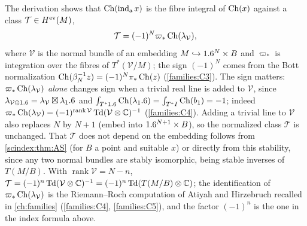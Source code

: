 \begin{remark}\label{scindex:rem:todd}
  The derivation shows that $\operatorname{Ch}(\operatorname{ind}_{\mathrm{a}} x)$ is the fibre integral of
  $\operatorname{Ch}(x)$ against a class $\mathcal T\in H^{\mathrm{ev}}(M)$,
  \begin{equation*}
    \mathcal T=(-1)^N\varpi_*\operatorname{Ch}(\lambda_{\mathcal V}),
  \end{equation*}
  where $\mathcal V$ is the normal bundle of an embedding $M\hookrightarrow
  1.6^N\times B$ and $\varpi_*$ is integration over the fibres of
  $T^*(\mathcal V/M)$; the sign $(-1)^N$ comes from the Bott normalization
  $\operatorname{Ch}(\beta_N^{-1}z)=(-1)^N\pi_*\operatorname{Ch}(z)$ (\ref{families:C3}). The sign matters:
  $\varpi_*\operatorname{Ch}(\lambda_{\mathcal V})$ \emph{alone} changes sign when a trivial
  real line is added to $\mathcal V$, since $\lambda_{\mathcal V\oplus1.6}=
  \lambda_{\mathcal V}\boxtimes\lambda_1.6$ and $\int_{T^*1.6}\operatorname{Ch}(\lambda_1.6)=
  \int_{T^*I}\operatorname{Ch}(b_1)=-1$; indeed $\varpi_*\operatorname{Ch}(\lambda_{\mathcal V})=
  (-1)^{\operatorname{rank}\mathcal V}\operatorname{Td}(\mathcal V\otimes\mathbb{C})^{-1}$
  (\ref{families:C4}). Adding a trivial line to $\mathcal V$ also replaces $N$ by
  $N+1$ (embed into $1.6^{N+1}\times B$), so the normalized class $\mathcal T$ is
  unchanged. That $\mathcal T$ does not depend on the embedding follows from
  \cref{scindex:thm:AS} (for $B$ a point and suitable $x$) or directly from this
  stability, since any two normal bundles are stably isomorphic, being stable
  inverses of $T(M/B)$. With $\operatorname{rank}\mathcal V=N-n$,
  $\mathcal T=(-1)^n\operatorname{Td}(\mathcal V\otimes\mathbb{C})^{-1}=(-1)^n\operatorname{Td}(T(M/B)\otimes\mathbb{C})$; the
  identification of $\varpi_*\operatorname{Ch}(\lambda_{\mathcal V})$ is the Riemann--Roch
  computation of Atiyah and Hirzebruch recalled in \cref{ch:families}
  (\ref{families:C4}, \ref{families:C5}), and the factor $(-1)^n$ is the one in
  the index formula above.
\end{remark}

